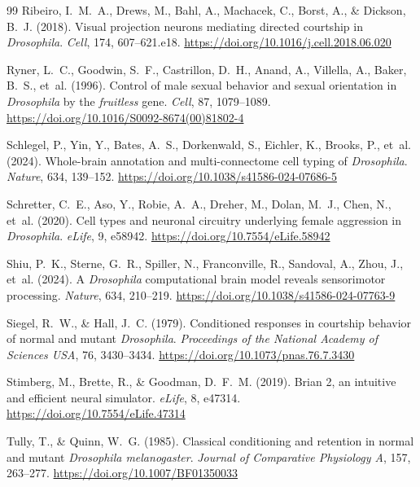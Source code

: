 \documentclass[11pt,a4paper]{article}
\begin{document}
\begin{thebibliography}{99}
Ribeiro, I.~M.~A., Drews, M., Bahl, A., Machacek, C., Borst, A., \& Dickson, B.~J. (2018). Visual projection neurons mediating directed courtship in \emph{Drosophila}. \emph{Cell}, 174, 607--621.e18. \url{https://doi.org/10.1016/j.cell.2018.06.020}

Ryner, L.~C., Goodwin, S.~F., Castrillon, D.~H., Anand, A., Villella, A., Baker, B.~S., et~al. (1996). Control of male sexual behavior and sexual orientation in \emph{Drosophila} by the \emph{fruitless} gene. \emph{Cell}, 87, 1079--1089. \url{https://doi.org/10.1016/S0092-8674(00)81802-4}

Schlegel, P., Yin, Y., Bates, A.~S., Dorkenwald, S., Eichler, K., Brooks, P., et~al. (2024). Whole-brain annotation and multi-connectome cell typing of \emph{Drosophila}. \emph{Nature}, 634, 139--152. \url{https://doi.org/10.1038/s41586-024-07686-5}

Schretter, C.~E., Aso, Y., Robie, A.~A., Dreher, M., Dolan, M.~J., Chen, N., et~al. (2020). Cell types and neuronal circuitry underlying female aggression in \emph{Drosophila}. \emph{eLife}, 9, e58942. \url{https://doi.org/10.7554/eLife.58942}

Shiu, P.~K., Sterne, G.~R., Spiller, N., Franconville, R., Sandoval, A., Zhou, J., et~al. (2024). A \emph{Drosophila} computational brain model reveals sensorimotor processing. \emph{Nature}, 634, 210--219. \url{https://doi.org/10.1038/s41586-024-07763-9}

Siegel, R.~W., \& Hall, J.~C. (1979). Conditioned responses in courtship behavior of normal and mutant \emph{Drosophila}. \emph{Proceedings of the National Academy of Sciences USA}, 76, 3430--3434. \url{https://doi.org/10.1073/pnas.76.7.3430}

Stimberg, M., Brette, R., \& Goodman, D.~F.~M. (2019). Brian 2, an intuitive and efficient neural simulator. \emph{eLife}, 8, e47314. \url{https://doi.org/10.7554/eLife.47314}

Tully, T., \& Quinn, W.~G. (1985). Classical conditioning and retention in normal and mutant \emph{Drosophila melanogaster}. \emph{Journal of Comparative Physiology A}, 157, 263--277. \url{https://doi.org/10.1007/BF01350033}


\end{thebibliography}
\end{document}

